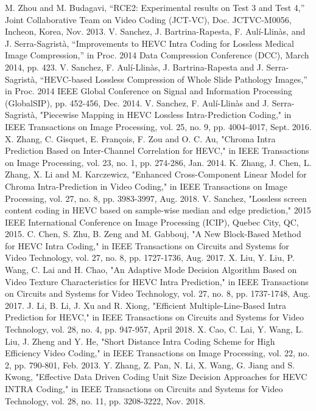 \documentclass[journal]{IEEEtran}
\begin{document}
\begin{thebibliography}{11}
M. Zhou and M. Budagavi, “RCE2: Experimental results on Test 3 and Test 4,” Joint Collaborative Team on Video Coding (JCT-VC), Doc. JCTVC-M0056, Incheon, Korea, Nov. 2013. 
V. Sanchez, J. Bartrina-Rapesta, F. Aulí-Llinàs, and J. Serra-Sagristà, “Improvements to HEVC Intra Coding for Lossless Medical Image Compression,” in Proc. 2014 Data Compression Conference (DCC), March 2014, pp. 423. 
V. Sanchez, F. Aulí-Llinàs, J. Bartrina-Rapesta and J. Serra-Sagristà, “HEVC-based Lossless Compression of Whole Slide Pathology Images,” in Proc. 2014 IEEE Global Conference on Signal and Information Processing (GlobalSIP), pp. 452-456, Dec. 2014. 
V. Sanchez, F. Aulí-Llinàs and J. Serra-Sagristà, "Piecewise Mapping in HEVC Lossless Intra-Prediction Coding," in IEEE Transactions on Image Processing, vol. 25, no. 9, pp. 4004-4017, Sept. 2016.
X. Zhang, C. Gisquet, E. François, F. Zou and O. C. Au, "Chroma Intra Prediction Based on Inter-Channel Correlation for HEVC," in IEEE Transactions on Image Processing, vol. 23, no. 1, pp. 274-286, Jan. 2014.
K. Zhang, J. Chen, L. Zhang, X. Li and M. Karczewicz, "Enhanced Cross-Component Linear Model for Chroma Intra-Prediction in Video Coding," in IEEE Transactions on Image Processing, vol. 27, no. 8, pp. 3983-3997, Aug. 2018.
V. Sanchez, "Lossless screen content coding in HEVC based on sample-wise median and edge prediction," 2015 IEEE International Conference on Image Processing (ICIP), Quebec City, QC, 2015.
C. Chen, S. Zhu, B. Zeng and M. Gabbouj, "A New Block-Based Method for HEVC Intra Coding," in IEEE Transactions on Circuits and Systems for Video Technology, vol. 27, no. 8, pp. 1727-1736, Aug. 2017.
X. Liu, Y. Liu, P. Wang, C. Lai and H. Chao, "An Adaptive Mode Decision Algorithm Based on Video Texture Characteristics for HEVC Intra Prediction," in IEEE Transactions on Circuits and Systems for Video Technology, vol. 27, no. 8, pp. 1737-1748, Aug. 2017.
 J. Li, B. Li, J. Xu and R. Xiong, "Efficient Multiple-Line-Based Intra Prediction for HEVC," in IEEE Transactions on Circuits and Systems for Video Technology, vol. 28, no. 4, pp. 947-957, April 2018.
X. Cao, C. Lai, Y. Wang, L. Liu, J. Zheng and Y. He, "Short Distance Intra Coding Scheme for High Efficiency Video Coding," in IEEE Transactions on Image Processing, vol. 22, no. 2, pp. 790-801, Feb. 2013.
Y. Zhang, Z. Pan, N. Li, X. Wang, G. Jiang and S. Kwong, "Effective Data Driven Coding Unit Size Decision Approaches for HEVC INTRA Coding," in IEEE Transactions on Circuits and Systems for Video Technology, vol. 28, no. 11, pp. 3208-3222, Nov. 2018.

\end{thebibliography}
\end{document}
